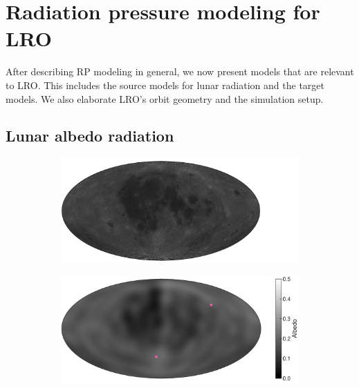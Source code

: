 \section{Radiation pressure modeling for LRO}

After describing \gls{RP} modeling in general, we now present models that are relevant to \gls{LRO}. This includes the source models for lunar radiation and the target models. We also elaborate \gls{LRO}'s orbit geometry and the simulation setup.

\subsection{Lunar albedo radiation}
\label{subsec:lunar-albedo}

\begin{figure}[t]
    \centering

    \begin{subfigure}[c]{0.49\textwidth}
        \includegraphics[width=\textwidth]{figures/plots/lunar_map_photo.pdf}
    \end{subfigure}
    \hfill
    \begin{subfigure}[c]{0.49\textwidth}
        \includegraphics[width=\textwidth]{figures/plots/lunar_map_dlam1.pdf}
    \end{subfigure}
    
    \bigskip
    

\end{figure}
